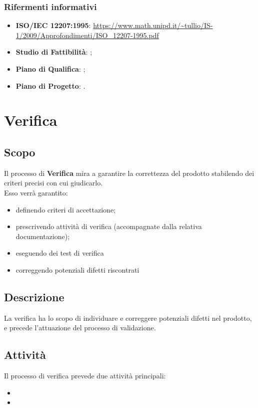 \documentclass[]{article}
\begin{document}
			\subsubsection{Rifermenti informativi}
			\begin{itemize}
				\item \textbf{ISO/IEC 12207:1995}: \url{https://www.math.unipd.it/~tullio/IS-1/2009/Approfondimenti/ISO_12207-1995.pdf}
				\item \textbf{Studio di Fattibilità}: ; %
				\item \textbf{Piano di Qualifica}: ;
				\item \textbf{Piano di Progetto}: .
			\end{itemize}
	
	\newpage	
	
	\section{Verifica}
		\subsection{Scopo}
		Il processo di \textbf{Verifica} mira a garantire la correttezza del prodotto stabilendo dei criteri precisi con cui giudicarlo. \\ Esso verrà garantito:
		\begin{itemize}
			\item definendo criteri di accettazione;
			\item prescrivendo attività di verifica (accompagnate dalla relativa documentazione);
			\item eseguendo dei test di verifica
			\item correggendo potenziali difetti riscontrati
		\end{itemize}

		\subsection{Descrizione}
		La verifica ha lo scopo di individuare e correggere potenziali difetti nel prodotto, e precede l'attuazione del processo di validazione.
		
		\subsection{Attività}
		Il processo di verifica prevede due attività principali:
		\begin{itemize}
			\item {}
			\item {}
		\end{itemize}
		
\end{document}
